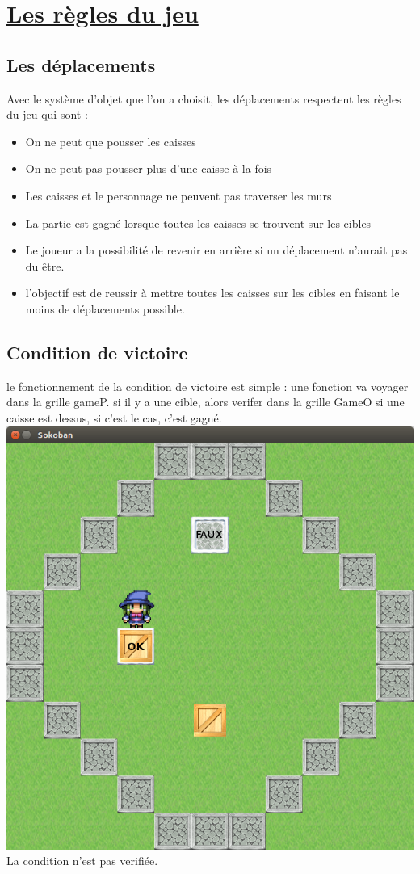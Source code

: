 \documentclass{article}
\begin{document}
\section{\underline{Les règles du jeu}}
	\subsection{Les déplacements}
	Avec le système d'objet que l'on a choisit, les déplacements respectent les règles du jeu qui sont :
	\begin{itemize}
	 \item On ne peut que pousser les caisses
	 \item On ne peut pas pousser plus d'une caisse à la fois
	 \item Les caisses et le personnage ne peuvent pas traverser les murs
	 \item La partie est gagné lorsque toutes les caisses se trouvent sur les cibles
	 \item Le joueur a la possibilité de revenir en arrière si un déplacement n'aurait pas du être.
	 \item l'objectif est de reussir à mettre toutes les caisses sur les cibles en faisant le moins de déplacements possible.
	\end{itemize}

	\subsection{Condition de victoire}
	le fonctionnement de la condition de victoire est simple : une fonction va voyager dans la grille gameP. si il y a une cible, alors verifer dans 
	la grille GameO si une caisse est dessus, si c'est le cas, c'est gagné.
	\newline
	\includegraphics[scale=0.25]{03.png}
	\newline
	La condition n'est pas verifiée.

	
		

\newpage
\end{document}
